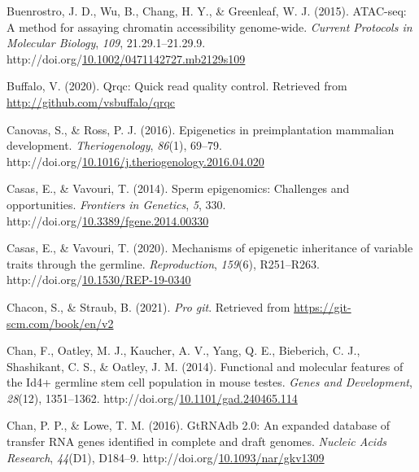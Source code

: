 \documentclass[12pt,twoside]{reedthesis}
\newlength{\cslhangindent}
\newenvironment{CSLReferences}[2] %
 {%
  \setlength{\parindent}{0pt}
  \ifodd #1 \everypar{\setlength{\hangindent}{\cslhangindent}}\ignorespaces\fi
  \ifnum #2 > 0
  \setlength{\parskip}{#2\baselineskip}
  \fi
 }%
 {}
\begin{document}
\begin{CSLReferences}{1}{0}
\leavevmode{}%
Buenrostro, J. D., Wu, B., Chang, H. Y., \& Greenleaf, W. J. (2015). ATAC-seq: A method for assaying chromatin accessibility genome-wide. \emph{Current Protocols in Molecular Biology}, \emph{109}, 21.29.1--21.29.9. http://doi.org/\href{https://doi.org/10.1002/0471142727.mb2129s109}{10.1002/0471142727.mb2129s109}

\leavevmode{}%
Buffalo, V. (2020). Qrqc: Quick read quality control. Retrieved from \url{http://github.com/vsbuffalo/qrqc}

\leavevmode{}%
Canovas, S., \& Ross, P. J. (2016). Epigenetics in preimplantation mammalian development. \emph{Theriogenology}, \emph{86}(1), 69--79. http://doi.org/\href{https://doi.org/10.1016/j.theriogenology.2016.04.020}{10.1016/j.theriogenology.2016.04.020}

\leavevmode{}%
Casas, E., \& Vavouri, T. (2014). Sperm epigenomics: Challenges and opportunities. \emph{Frontiers in Genetics}, \emph{5}, 330. http://doi.org/\href{https://doi.org/10.3389/fgene.2014.00330}{10.3389/fgene.2014.00330}

\leavevmode{}%
Casas, E., \& Vavouri, T. (2020). Mechanisms of epigenetic inheritance of variable traits through the germline. \emph{Reproduction}, \emph{159}(6), R251--R263. http://doi.org/\href{https://doi.org/10.1530/REP-19-0340}{10.1530/REP-19-0340}

\leavevmode{}%
Chacon, S., \& Straub, B. (2021). \emph{Pro git}. Retrieved from \url{https://git-scm.com/book/en/v2}

\leavevmode{}%
Chan, F., Oatley, M. J., Kaucher, A. V., Yang, Q. E., Bieberich, C. J., Shashikant, C. S., \& Oatley, J. M. (2014). Functional and molecular features of the Id4+ germline stem cell population in mouse testes. \emph{Genes and Development}, \emph{28}(12), 1351--1362. http://doi.org/\href{https://doi.org/10.1101/gad.240465.114}{10.1101/gad.240465.114}

\leavevmode{}%
Chan, P. P., \& Lowe, T. M. (2016). GtRNAdb 2.0: An expanded database of transfer RNA genes identified in complete and draft genomes. \emph{Nucleic Acids Research}, \emph{44}(D1), D184--9. http://doi.org/\href{https://doi.org/10.1093/nar/gkv1309}{10.1093/nar/gkv1309}


\end{CSLReferences}
\end{document}
